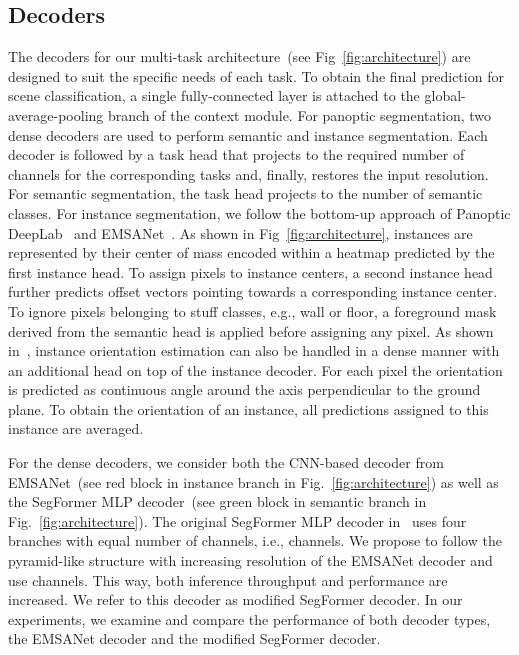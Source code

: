 \documentclass[conference]{IEEEtran}
\begin{document}
\subsection{Decoders}
\label{sec:main:decoders}
The decoders for our multi-task architecture~(see Fig~\ref{fig:architecture}) are designed to suit the specific needs of each task.
To obtain the final prediction for scene classification, a single fully-connected layer is attached to the global-average-pooling branch of the context module.
For panoptic segmentation, two dense decoders are used to perform semantic and instance segmentation.
Each decoder is followed by a task head that projects to the required number of channels for the corresponding tasks and, finally, restores the input resolution.
For semantic segmentation, the task head projects to the number of semantic classes.
For instance segmentation, we follow the bottom-up approach of Panoptic DeepLab~\cite{PanopticDeeplab-cvpr2020} and EMSANet~\cite{emsanet2022ijcnn}.
As shown in Fig~\ref{fig:architecture}, instances are represented by their center of mass encoded within a heatmap predicted by the first instance head.
To assign pixels to instance centers, a second instance head further predicts offset vectors pointing towards a corresponding instance center.
To ignore pixels belonging to stuff classes, e.g., wall or floor, a foreground mask derived from the semantic head is applied before assigning any pixel.
As shown in~\cite{emsanet2022ijcnn}, instance orientation estimation can also be handled in a dense manner with an additional head on top of the instance decoder.
For each pixel the orientation is predicted as continuous angle around the axis perpendicular to the ground plane.
To obtain the orientation of an instance, all predictions assigned to this instance are averaged.

For the dense decoders, we consider both the CNN-based decoder from EMSANet~(see red block in instance branch in Fig.~\ref{fig:architecture}) as well as the SegFormer MLP decoder~(see green block in semantic branch in Fig.~\ref{fig:architecture}).
The original SegFormer MLP decoder in~\cite{SegFromer-neurips2021} uses four branches with equal number of channels, i.e.,  channels. 
We propose to follow the pyramid-like structure with increasing resolution of the EMSANet decoder and use  channels. 
This way, both inference throughput and performance are increased.
We refer to this decoder as modified SegFormer decoder.
In our experiments, we examine and compare the performance of both decoder types, the EMSANet decoder and the modified SegFormer decoder.
\end{document}
